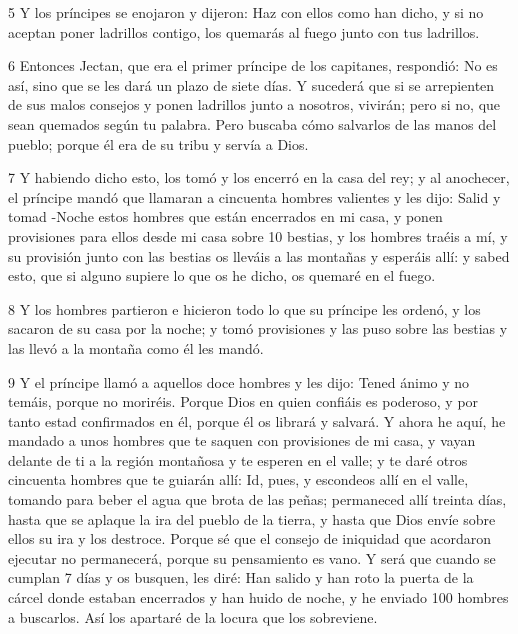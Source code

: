 \par 5 Y los príncipes se enojaron y dijeron: Haz con ellos como han dicho, y si no aceptan poner ladrillos contigo, los quemarás al fuego junto con tus ladrillos.

\par 6 Entonces Jectan, que era el primer príncipe de los capitanes, respondió: No es así, sino que se les dará un plazo de siete días. Y sucederá que si se arrepienten de sus malos consejos y ponen ladrillos junto a nosotros, vivirán; pero si no, que sean quemados según tu palabra. Pero buscaba cómo salvarlos de las manos del pueblo; porque él era de su tribu y servía a Dios.

\par 7 Y habiendo dicho esto, los tomó y los encerró en la casa del rey; y al anochecer, el príncipe mandó que llamaran a cincuenta hombres valientes y les dijo: Salid y tomad -Noche estos hombres que están encerrados en mi casa, y ponen provisiones para ellos desde mi casa sobre 10 bestias, y los hombres traéis a mí, y su provisión junto con las bestias os lleváis a las montañas y esperáis allí: y sabed esto, que si alguno supiere lo que os he dicho, os quemaré en el fuego.

\par 8 Y los hombres partieron e hicieron todo lo que su príncipe les ordenó, y los sacaron de su casa por la noche; y tomó provisiones y las puso sobre las bestias y las llevó a la montaña como él les mandó.

\par 9 Y el príncipe llamó a aquellos doce hombres y les dijo: Tened ánimo y no temáis, porque no moriréis. Porque Dios en quien confiáis es poderoso, y por tanto estad confirmados en él, porque él os librará y salvará. Y ahora he aquí, he mandado a unos hombres que te saquen con provisiones de mi casa, y vayan delante de ti a la región montañosa y te esperen en el valle; y te daré otros cincuenta hombres que te guiarán allí: Id, pues, y escondeos allí en el valle, tomando para beber el agua que brota de las peñas; permaneced allí treinta días, hasta que se aplaque la ira del pueblo de la tierra, y hasta que Dios envíe sobre ellos su ira y los destroce. Porque sé que el consejo de iniquidad que acordaron ejecutar no permanecerá, porque su pensamiento es vano. Y será que cuando se cumplan 7 días y os busquen, les diré: Han salido y han roto la puerta de la cárcel donde estaban encerrados y han huido de noche, y he enviado 100 hombres a buscarlos. Así los apartaré de la locura que los sobreviene.

